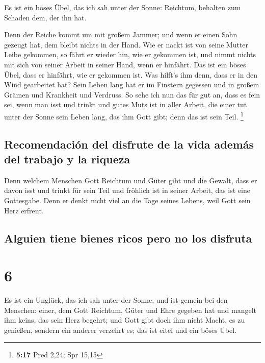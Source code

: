  Es ist ein böses Übel, das ich sah unter der Sonne:
Reichtum, behalten zum Schaden dem, der ihn hat.

 Denn der Reiche kommt um mit großem Jammer; und wenn er
einen Sohn gezeugt hat, dem bleibt nichts in der Hand. 
Wie er nackt ist von seine Mutter Leibe gekommen, so fährt er wieder
hin, wie er gekommen ist, und nimmt nichts mit sich von seiner Arbeit in
seiner Hand, wenn er hinfährt.  Das ist ein böses Übel,
dass er hinfährt, wie er gekommen ist. Was hilft's ihm denn, dass er in
den Wind gearbeitet hat?  Sein Leben lang hat er im
Finstern gegessen und in großem Grämen und Krankheit und Verdruss.
 So sehe ich nun das für gut an, dass es fein sei, wenn
man isst und trinkt und gutes Muts ist in aller Arbeit, die einer tut
unter der Sonne sein Leben lang, das ihm Gott gibt; denn das ist sein
Teil. \footnote{\textbf{5:17} Pred 2,24; Spr 15,15}

\hypertarget{recomendaciuxf3n-del-disfrute-de-la-vida-ademuxe1s-del-trabajo-y-la-riqueza}{%
\subsection{Recomendación del disfrute de la vida además del trabajo y
la
riqueza}\label{recomendaciuxf3n-del-disfrute-de-la-vida-ademuxe1s-del-trabajo-y-la-riqueza}}

 Denn welchem Menschen Gott Reichtum und Güter gibt und
die Gewalt, dass er davon isst und trinkt für sein Teil und fröhlich ist
in seiner Arbeit, das ist eine Gottesgabe.  Denn er denkt
nicht viel an die Tage seines Lebens, weil Gott sein Herz erfreut.

\hypertarget{alguien-tiene-bienes-ricos-pero-no-los-disfruta}{%
\subsection{Alguien tiene bienes ricos pero no los
disfruta}\label{alguien-tiene-bienes-ricos-pero-no-los-disfruta}}

\hypertarget{section-5}{%
\section{6}\label{section-5}}

 Es ist ein Unglück, das ich sah unter der Sonne, und ist
gemein bei den Menschen:  einer, dem Gott Reichtum, Güter
und Ehre gegeben hat und mangelt ihm keins, das sein Herz begehrt; und
Gott gibt doch ihm nicht Macht, es zu genießen, sondern ein anderer
verzehrt es; das ist eitel und ein böses Übel.


